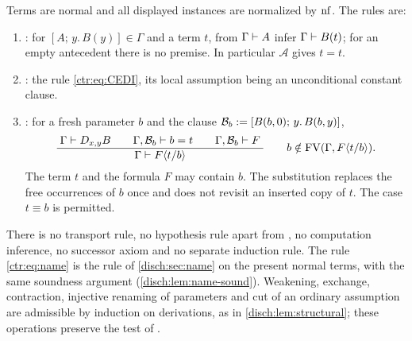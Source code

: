 \begin{definition}\label{ctr:def:name}
Terms are normal and all displayed instances are normalized by $\operatorname{nf}$. The rules are:
\begin{enumerate}
\item {}: for $[A;\,y.\,B(y)]\in\Gamma$ and a term $t$, from $\Gamma\vdash A$
infer $\Gamma\vdash B(t)$; for an empty antecedent there is no premise. In particular
$\mathcal A$ gives $t=t$.
\item {}: the rule \eqref{ctr:eq:CEDI}, its local assumption being an
unconditional constant clause.
\item {}: for a fresh parameter $b$ and the clause
$\mathcal B_b\mathrel{:=}[B(b,0);\,y.\,B(b,y)]$,
\begin{equation}\label{ctr:eq:name}
 \dfrac{\;\Gamma\vdash D_{x,y}B\qquad \Gamma,\mathcal B_b\vdash b=t\qquad
          \Gamma,\mathcal B_b\vdash F\;}{\;\Gamma\vdash F\langle t/b\rangle\;}
 \qquad b\notin\operatorname{FV}(\Gamma,F\langle t/b\rangle).
\end{equation}
The term $t$ and the formula $F$ may contain $b$. The substitution replaces the free
occurrences of $b$ once and does not revisit an inserted copy of $t$. The case $t\equiv b$
is permitted.
\end{enumerate}
\end{definition}

There is no transport rule, no hypothesis rule apart from , no computation
inference, no successor axiom and no separate induction rule. The rule \eqref{ctr:eq:name}
is the rule  of \cref{disch:sec:name} on the present normal terms, with the
same soundness argument (\cref{disch:lem:name-sound}). Weakening, exchange, contraction,
injective renaming of parameters and cut of an ordinary assumption are admissible by
induction on derivations, as in \cref{disch:lem:structural}; these operations preserve the
test of .

